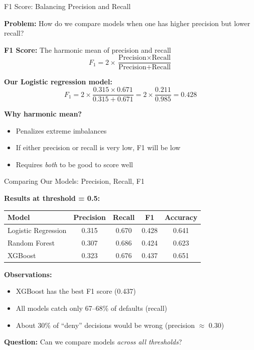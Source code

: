\documentclass[10pt]{beamer}
\begin{document}
\begin{frame}{F1 Score: Balancing Precision and Recall}

  \textbf{Problem:} How do we compare models when one has higher precision but lower recall?

  \vspace{1em}
  \textbf{F1 Score:} The harmonic mean of precision and recall
  \[
  F_1 = 2 \times \frac{\text{Precision} \times \text{Recall}}{\text{Precision} + \text{Recall}}
  \]

  \vspace{0.5em}
  \textbf{Our Logistic regression model:}
  \[
  F_1 = 2 \times \frac{0.315 \times 0.671}{0.315 + 0.671} = 2 \times \frac{0.211}{0.985} = 0.428
  \]

  \vspace{1em}
  \textbf{Why harmonic mean?}
  \begin{itemize}
    \item Penalizes extreme imbalances
    \item If either precision or recall is very low, F1 will be low
    \item Requires \textit{both} to be good to score well
  \end{itemize}
\end{frame}


\begin{frame}{Comparing Our Models: Precision, Recall, F1}

  \textbf{Results at threshold = 0.5:}

  \vspace{0.5em}
  \begin{center}
  \begin{tabular}{lcccc}
    \toprule
    \textbf{Model} & \textbf{Precision} & \textbf{Recall} & \textbf{F1} & \textbf{Accuracy} \\
    \midrule
Logistic Regression	&0.315	&0.670	&0.428 & 0.641\\
Random Forest	&0.307	&0.686	&0.424 & 0.623\\
XGBoost	&0.323	&0.676	&0.437 & 0.651\\
    \bottomrule
  \end{tabular}
  \end{center}

  \vspace{1em}
  \textbf{Observations:}
  \begin{itemize}
    \item XGBoost has the best F1 score (0.437)
    \item All models catch only 67--68\% of defaults (recall)
    \item About 30\% of ``deny'' decisions would be wrong (precision $\approx$ 0.30)
  \end{itemize}

  \vspace{0.5em}
  \textbf{Question:} Can we compare models \textit{across all thresholds}?
\end{frame}
\end{document}
